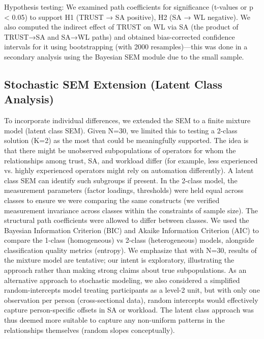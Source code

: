 \documentclass[conference]{IEEEtran}
\begin{document}
Hypothesis testing: We examined path coefficients for significance (t-values or p < 0.05) to support H1 (TRUST → SA positive), H2 (SA → WL negative). We also computed the indirect effect of TRUST on WL via SA (the product of TRUST→SA and SA→WL paths) and obtained bias-corrected confidence intervals for it using bootstrapping (with 2000 resamples)—this was done in a secondary analysis using the Bayesian SEM module due to the small sample.

\subsection{Stochastic SEM Extension (Latent Class Analysis)}
To incorporate individual differences, we extended the SEM to a finite mixture model (latent class SEM). Given N=30, we limited this to testing a 2-class solution (K=2) as the most that could be meaningfully supported. The idea is that there might be unobserved subpopulations of operators for whom the relationships among trust, SA, and workload differ (for example, less experienced vs. highly experienced operators might rely on automation differently). A latent class SEM can identify such subgroups if present. In the 2-class model, the measurement parameters (factor loadings, thresholds) were held equal across classes to ensure we were comparing the same constructs (we verified measurement invariance across classes within the constraints of sample size). The structural path coefficients were allowed to differ between classes. We used the Bayesian Information Criterion (BIC) and Akaike Information Criterion (AIC) to compare the 1-class (homogeneous) vs 2-class (heterogeneous) models, alongside classification quality metrics (entropy). We emphasize that with N=30, results of the mixture model are tentative; our intent is exploratory, illustrating the approach rather than making strong claims about true subpopulations. As an alternative approach to stochastic modeling, we also considered a simplified random-intercepts model treating participants as a level-2 unit, but with only one observation per person (cross-sectional data), random intercepts would effectively capture person-specific offsets in SA or workload. The latent class approach was thus deemed more suitable to capture any non-uniform patterns in the relationships themselves (random slopes conceptually).
\end{document}
